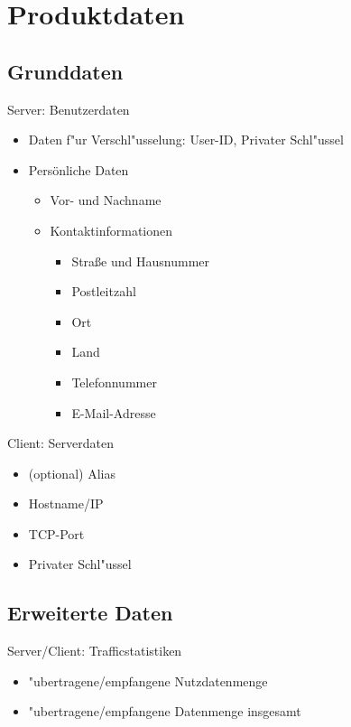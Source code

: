 \documentclass[a4paper,10pt]{scrartcl}
\begin{document}
\section{Produktdaten}

\subsection{Grunddaten}
\begin{usecase}
 {Server: Benutzerdaten
   \begin{itemize}
   \item Daten f"ur Verschl"usselung: User-ID, Privater Schl"ussel
   \item Persönliche Daten
      \begin{itemize}
      \item Vor- und Nachname
      \item Kontaktinformationen
         \begin{itemize}
         \item Straße und Hausnummer
         \item Postleitzahl
         \item Ort
         \item Land
         \item Telefonnummer
         \item E-Mail-Adresse
         \end{itemize}
      \end{itemize}
   \end{itemize}
}
 {Client: Serverdaten
   \begin{itemize}
   \item (optional) Alias
   \item Hostname/IP
   \item TCP-Port
   \item Privater Schl"ussel
   \end{itemize}
}
\end{usecase}

\subsection{Erweiterte Daten}
\begin{usecase}
 {Server/Client: Trafficstatistiken
   \begin{itemize}
   \item "ubertragene/empfangene Nutzdatenmenge
   \item "ubertragene/empfangene Datenmenge insgesamt
   \end{itemize}
}
\end{usecase}
\end{document}
